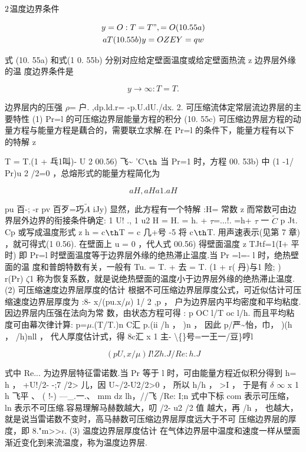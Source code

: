 ${\rm 2}$温度边界条件

\begin{gather*}
y=O:T=T ", =O (10. 55a)\\
aT (10. 55b) y=OZEY=qw
\end{gather*}

式 (10. 55a) 和式(1 0. 55b) 分别对应给定壁面温度或给定壁面热流 z 边界层外缘的温 度边界条件是

\[y \rightarrow \infty  : T= T.\]

边界层内的压强 $\rho$= 户. ,dp.ld.r= -p.U.dU./dx. 2. 可压缩流体定常层流边界层的主要特性 (1) Pr=l 的可压缩边界层能量方程的积分 (10. 55c) 可压缩边界层方程的动量方程与能量方程是藕合的，需要联立求解.在 Pr=l 的条件下，能量方程有以下的特解 z

T = T.(1 + 乓1叫)- U 2 00.56) 飞\textasciitilde{} 'C${\rm þ}$ 当 Pr=1 时，方程 00. 53b) 中 (1 -1/ Pr)u 2 /2=0 ，总熔形式的能量方程简化为

\[aH , aH a 1. aH \]

pu 百-; -r pv 百歹=巧$\tilde{A}$ iJy) 显然，此方程有一个特解 :H= 常数 z 而常数可由边界层外边界的衔接条件确定: 1 U! ., 1 u2 H = H. = h. + $\tau$=...!. =h+ $\tau$ 一 $\tilde{C}$ p Jt. Cp 或写成温度形式 z h = c${\rm þ}$T = c 几+号 -5 将 c${\rm þ}$T. 用声速表示(见第 7 章) ，就可得式(1 0.56). 在壁面上 u = 0 ，代人式 00.56) 得壁面温度 z TJtf=1(I+ 平时) 即 Pr=l 时壁面温度等于边界层外缘的绝热滞止温度.当 Pr =l=- l 时，绝热壁面的温 度和普朗特数有关，一般有 Tu. = T. + 去 = T. (1 + r( 丹)与1 险; ) r(Pr) $\zeta$1 称为恢复系数，就是说绝热壁面的温度小于边界层外缘的绝热滞止温度. (2) 可压缩速度边界层厚度的估计 根据不可压缩边界层厚度公式，可近似估计可压缩速度边界层厚度为 :8- x/(pu.x/$\mu$) 1/ 2 ,p ， 户为边界层内平均密度和平均粘度.因边界层内压强在法向为常 数，由状态方程可得 : p OC l/T oc l/h. 而且平均粘度可由幕次律计算: p=$\mu$.(T/T.)n C汇 p.(ii /h ， )n ， 因此 p/严\textasciitilde{}怡，巾， )(h ， /h)nll ， 代人厚度估计式，得 8c汇 x 1 主- \textbackslash\{\}号=一王一/豆\}哼l

\[(pU ,x /\mu ) I! Z   h. J /Re:   h. J\]

式中 Re... 为边界层特征雷诺数.当 Pr 等于 l 时，可由能量方程近似积分得到 h= h ， +U!/2- -;7 /2> 儿，因 U\textasciitilde{}/2-U2/2>0 ， 所以 h/h ， >I ， 于是有 $\delta$ $\infty$ x 1 h 飞平 、 ( !-) ---\_.一.、 mm dz lh，//飞 /Re: I;n 式中下标 com 表示可压缩， ln 表示不可压缩.容易理解马赫数越大，叨 /2- u2 /2 值 越大，再 /h ， 也越大，就是说当雷诺数不变时，高马赫数可压缩边界层厚度远大于不可 压缩边界层的厚度，即 8."m>>$\iota$. (3) 温度边界层厚度估计 在气体边界层中温度和速度一样从壁面渐近变化到来流温度，称为温度边界层.

